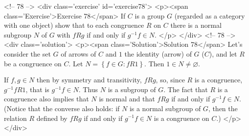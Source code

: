 <!-- 78 -->
<div class='exercise' id='exercise78'>
<p><span class='Exercise'>Exercise 78</span>
If $C$ is a group $G$ (regarded as a category with one object) show that to each congruence $R$ on $C$ there is a normal subgroup $N$ of $G$ with $fRg$ if and only if $g^{-1}f\in N$.
</p>
</div>
<!-- 78 -->
<div class='solution'>
<p><span class='Solution'>Solution 78</span>
Let's consider the set $G$ of arrows of $C$ and $1$ the identity (arrow) of $G$ ($C$), and let $R$ be a congruence on $C$. Let $N=\left\{f\in G:fR1\right\}$. Then $1\in N\neq\varnothing$.

If $f,g\in N$ then by symmetry and transitivity, $fRg$, so, since $R$ is a congruence, $g^{-1}fR1$, that is $g^{-1}f\in N$. Thus $N$ is a subgroup of $G$. The fact that $R$ is a congruence also implies that $N$ is normal and that $fRg$ if and only if $g^{-1}f\in N$. (Notice that the converse also holds: if $N$ is a normal subgroup of $G$, then the relation $R$ defined by $fRg$ if and only if $g^{-1}f\in N$ is a congruence on $C$.)
</p>
</div>
